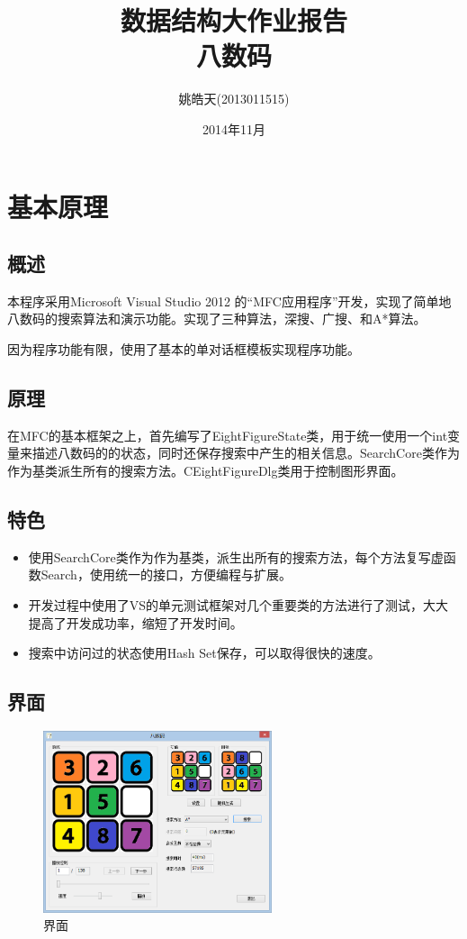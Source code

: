 \documentclass[12pt,a4paper]{article}
\author{姚皓天(2013011515)}
\title{数据结构大作业报告\\八数码}
\date{2014年11月}
\begin{document}
\maketitle
\thispagestyle{empty}

\newpage
\thispagestyle{empty}
\renewcommand\contentsname{\textbf{目录}}
\tableofcontents

\newpage
\section{基本原理}
\subsection{概述}
本程序采用Microsoft Visual Studio 2012 的“MFC应用程序”开发，实现了简单地八数码的搜索算法和演示功能。实现了三种算法，深搜、广搜、和A*算法。

因为程序功能有限，使用了基本的单对话框模板实现程序功能。
\subsection{原理}
在MFC的基本框架之上，首先编写了EightFigureState类，用于统一使用一个int变量来描述八数码的的状态，同时还保存搜索中产生的相关信息。SearchCore类作为作为基类派生所有的搜索方法。CEightFigureDlg类用于控制图形界面。
\subsection{特色}
\begin{itemize}
\item 使用SearchCore类作为作为基类，派生出所有的搜索方法，每个方法复写虚函数Search，使用统一的接口，方便编程与扩展。
\item 开发过程中使用了VS的单元测试框架对几个重要类的方法进行了测试，大大提高了开发成功率，缩短了开发时间。
\item 搜索中访问过的状态使用Hash Set保存，可以取得很快的速度。
\end{itemize}
\subsection{界面}
\begin{figure}[H]
\centering
\includegraphics[width=0.6\textwidth]{1.png}
\caption{界面} 
\end{figure}
\end{document}

